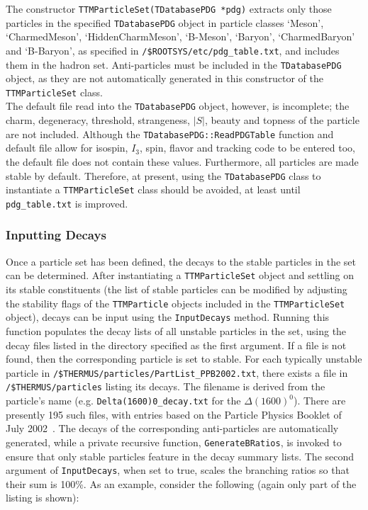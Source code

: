 \documentclass{elsarticle}
\begin{document}
The constructor \texttt{TTMParticleSet(TDatabasePDG *pdg)} extracts only those particles in 
the specified \texttt{TDatabasePDG} object in particle classes `Meson', `CharmedMeson', `HiddenCharmMeson', 
`B-Meson', `Baryon', `CharmedBaryon' and `B-Baryon', as specified in \texttt{/\$ROOTSYS/etc/pdg\_table.txt}, 
and includes them in the hadron set. Anti-particles must be included in the \texttt{TDatabasePDG} object, 
as they are not automatically generated in this constructor of the \texttt{TTMParticleSet} class.\\

The default file read into the \texttt{TDatabasePDG} object, however, is incomplete; the charm, degeneracy, 
threshold, strangeness, $\left|S\right|$, beauty and topness of the particle are not included. 
Although the \texttt{TDatabasePDG::ReadPDGTable} function and default file allow for isospin, 
$I_3$, spin, flavor and tracking code to be entered too, the default file does not contain these values. 
Furthermore, all particles are made stable by default. Therefore, at present, using the 
\texttt{TDatabasePDG} 
class to instantiate a \texttt{TTMParticleSet} class should be avoided, at least until \texttt{pdg\_table.txt} is improved. 

\subsubsection{Inputting Decays}

Once a particle set has been defined, the decays to the stable particles 
in the set can be determined. After instantiating a \texttt{TTMParticleSet} 
object and settling on its stable constituents (the list of stable particles 
can be modified by adjusting the stability flags 
of the \texttt{TTMParticle} objects included in the \texttt{TTMParticleSet} object), 
decays can be input using the \texttt{InputDecays} method. 
Running this function populates the decay lists of 
all unstable particles in the set, using the decay files listed in the directory 
specified as the first argument. If a file is not found, then the corresponding particle 
is set to stable. For each typically unstable particle in 
\texttt{/\$THERMUS/particles/PartList\_PPB2002.txt}, there exists a file in 
\texttt{/\$THERMUS/particles} listing its decays. The 
filename is derived from the particle's name (e.g. \texttt{Delta(1600)0\_decay.txt} 
for the $\Delta(1600)^0$). There are presently 195 such files, with entries 
based on the Particle Physics Booklet of July 2002~\cite{Hagiwara:2002fs}. The decays of the 
corresponding anti-particles are 
automatically generated, while a private recursive function, \texttt{GenerateBRatios}, 
is invoked to ensure that only stable particles feature in the decay summary lists. The second argument of \texttt{InputDecays}, when set to true, scales the 
branching ratios so that their sum is 100\%. As an example, consider the 
following (again only part of the listing is shown):\\
\end{document}
